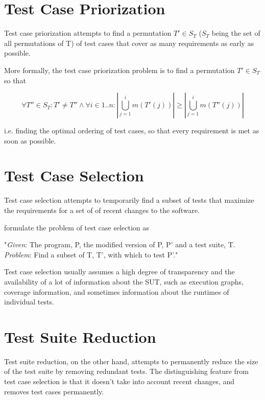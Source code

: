 \section{Test Case Priorization}

Test case priorization attempts to find a permutation $T' \in S_{T}$
($S_{T}$ being the set of all permutations of T) of test cases that
cover as many requirements as early as possible.

More formally, the test case priorization problem is to find a permutation
$T' \in S_{T}$ so that

$$ \forall T'' \in S_{T}: T' \neq T'' \land \forall i \in 1..n: |\bigcup_{j=1}^{i} m(T'(j))| \geq |\bigcup_{j=1}^{i} m(T''(j))| $$

i.e. finding the optimal ordering of test cases, so that every requirement
is met as soon as possible.


\section{Test Case Selection}

Test case selection attempts to temporarily find a subset of tests that
maximize the requirements for a set of of recent changes to the software.

\cite{yoo2012regression} formulate the problem of test case selection as

"\textit{Given}: The program, P, the modified version of P, P' and a test suite, T. \\
\textit{Problem}: Find a subset of T, T', with which to test P'."

Test case selection usually assumes a high degree of transparency and
the availability of a lot of information about the SUT, such as execution
graphs, coverage information, and sometimes information about the runtimes
of individual tests.

\section{Test Suite Reduction}

Test suite reduction, on the other hand, attempts to permanently reduce
the size of the test suite by removing redundant tests. The distinguishing
feature from test case selection is that it doesn't take into account
recent changes, and removes test cases permanently.


